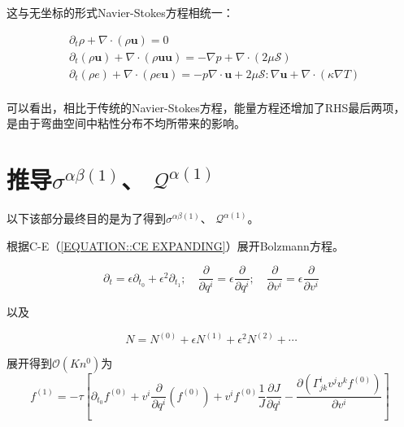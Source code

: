 \documentclass[LBMDerivation.tex]{subfiles}
\begin{document}
这与无坐标的形式Navier-Stokes方程相统一：


\begin{equation}
  \begin{aligned}
     & \partial_t \rho + \nabla \cdot (\rho \boldsymbol{u})=0                                                                                                                               \\
     & \partial_{t}\left(\rho \boldsymbol{u} \right)+ \nabla \cdot (\rho \boldsymbol{u} \boldsymbol{u}) = -\nabla p + \nabla \cdot ( 2\mu \mathcal{S})                                      \\
     & \partial_{t}\left(\rho e \right) + \nabla \cdot (\rho e \boldsymbol{u})= -p \nabla \cdot \boldsymbol{u} + 2\mu \mathcal{S}:\nabla \boldsymbol{u}    +  \nabla \cdot(\kappa \nabla T) \\
  \end{aligned}
  \label{EQUATION::E} ~
\end{equation}
%


可以看出，相比于传统的Navier-Stokes方程，能量方程还增加了RHS最后两项，是由于弯曲空间中粘性分布不均所带来的影响。


\appendix
\chapter{推导$\sigma^{\alpha\beta(1)}$、 $\mathcal{Q}^{\alpha (1)}$}
以下该部分最终目的是为了得到$\sigma^{\alpha\beta(1)}$、 $\mathcal{Q}^{\alpha (1)}$。


根据C-E（\ref{EQUATION::CE EXPANDING}）展开Bolzmann方程。

%
%
$$
  \partial_{t}=\epsilon \partial_{t_{0}}+\epsilon^{2} \partial_{t_{1}} ; \quad \frac{\partial}{\partial q^{i}}=\epsilon \frac{\partial}{\partial q^{i}} ; \quad \frac{\partial}{\partial v^{i}}=\epsilon \frac{\partial}{\partial v^{i}}
$$

以及

$$
  N=N^{(0)}+\epsilon N^{(1)}+\epsilon^{2} N^{(2)}+\cdots
$$
%

展开得到$\mathcal{O}\left(K n^{0}\right)$为
\begin{equation}
  f^{(1)}=-\tau\left[\partial_{t_{0}} f^{(0)}+v^{i} \frac{\partial}{\partial q^{i}}\left(f^{(0)}\right) +  v^if^{(0)} \frac{1}{J} \frac{\partial J}{\partial q^i} -\frac{\partial\left(\Gamma_{j k}^{i} v^{j} v^{k} f^{(0)}\right)}{\partial v^{i}}\right]
  \label{EQUATION::B.4} ~
\end{equation}
%
\end{document}
